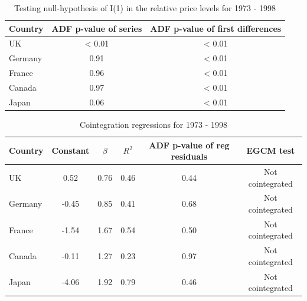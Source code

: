 \documentclass[]{article}
\begin{document}
\begin{table}

\caption{\label{tab:pl2}Testing null-hypothesis of I(1) in the relative price levels for 1973 - 1998}
\centering
\begin{tabular}[t]{lcc}
\toprule
Country & ADF p-value of series & ADF p-value of first differences\\
\midrule
UK & < 0.01 & < 0.01\\
Germany & 0.91 & < 0.01\\
France & 0.96 & < 0.01\\
Canada & 0.97 & < 0.01\\
Japan & 0.06 & < 0.01\\
\bottomrule
\end{tabular}
\end{table}

\begin{table}

\caption{\label{tab:coin2}Cointegration regressions for 1973 - 1998}
\centering
\begin{tabular}[t]{lccccc}
\toprule
Country & Constant & $\beta$ & $R^2$ & ADF p-value of reg residuals & EGCM test\\
\midrule
UK & 0.52 & 0.76 & 0.46 & 0.44 & Not cointegrated\\
Germany & -0.45 & 0.85 & 0.41 & 0.68 & Not cointegrated\\
France & -1.54 & 1.67 & 0.54 & 0.50 & Not cointegrated\\
Canada & -0.11 & 1.27 & 0.23 & 0.97 & Not cointegrated\\
Japan & -4.06 & 1.92 & 0.79 & 0.46 & Not cointegrated\\
\bottomrule
\end{tabular}
\end{table}
\end{document}
